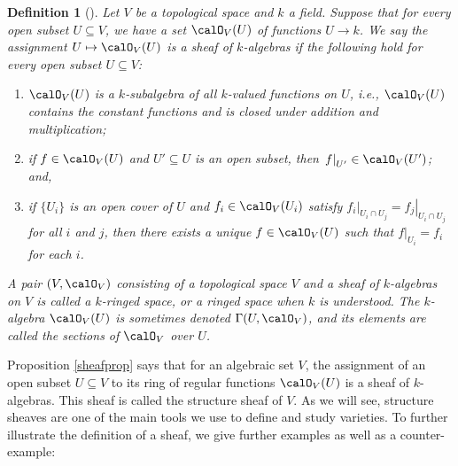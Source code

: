 \documentclass[12pt]{amsart}
\theoremstyle{plain}
\newtheorem{definition}[theorem]{Definition}
\begin{document}
\begin{definition}[{\cite[Chapter 3, a.]{Milne13}}]\label{sheafdef}
Let $V$ be a topological space and $k$ a field.
Suppose that for every open subset $U \subseteq V$, we have a set $\calO_V(U)$ of functions $U \to k$.
We say the assignment $U \mapsto \calO_V(U)$ is a sheaf of $k$-algebras if the following hold for every open subset $U \subseteq V$:
\begin{enumerate}
\item
$\calO_V(U)$ is a $k$-subalgebra of all $k$-valued functions on $U$, i.e., $\calO_V(U)$ contains the constant functions and is closed under addition and multiplication;
\item
if $f \in \calO_V(U)$ and $U'\subseteq U$ is an open subset, then $\left. f \right|_{U'} \in \calO_V(U')$; and,
\item
if $\{U_i\}$ is an open cover of $U$ and $f_i \in \calO_V(U_i)$ satisfy $\left. f_i \right|_{U_i \cap U_j} = \left. f_j \right|_{U_i \cap U_j}$ for all $i$ and $j$, then there exists a unique $f \in \calO_V(U)$ such that $\left. f\right|_{U_i} = f_i$ for each $i$.
\end{enumerate}
A pair $(V, \calO_V)$ consisting of a topological space $V$ and a sheaf of $k$-algebras on $V$ is called a $k$-ringed space, or a ringed space when $k$ is understood.
The $k$-algebra $\calO_V(U)$ is sometimes denoted $\Gamma(U, \calO_V)$, and its elements are called the sections of $\calO_V$ over $U$.
\end{definition}

Proposition \ref{sheafprop} says that for an algebraic set $V$, the assignment of an open subset $U \subseteq V$ to its ring of regular functions $\calO_V(U)$ is a sheaf of $k$-algebras.
This sheaf is called the structure sheaf of $V$.
As we will see, structure sheaves are one of the main tools we use to define and study varieties.
To further illustrate the definition of a sheaf, we give further examples as well as a counter-example:
\end{document}
